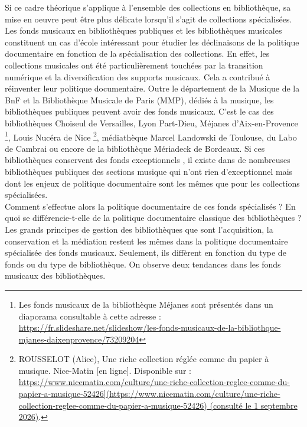 Si ce cadre théorique s'applique à l'ensemble des collections en bibliothèque, sa mise en oeuvre peut être plus délicate lorsqu'il s'agit de collections spécialisées.
Les fonds musicaux en bibliothèques publiques et les bibliothèques musicales constituent un cas d'école intéressant pour étudier les déclinaisons de la politique documentaire en fonction de la spécialisation des collections. 
En effet, les collections musicales ont été particulièrement touchées par la transition numérique et la diversification des supports musicaux. Cela a contribué à réinventer leur politique documentaire. 
Outre le département de la Musique de la BnF et la Bibliothèque Musicale de Paris (MMP), dédiés à la musique, les bibliothèques publiques peuvent avoir des fonds musicaux. C'est le cas des bibliothèques Choiseul de Versailles, Lyon Part-Dieu, Méjanes d'Aix-en-Provence \footnote{Les fonds musicaux de la bibliothèque Méjanes sont présentés dans un diaporama consultable à cette adresse : \url{https://fr.slideshare.net/slideshow/les-fonds-musicaux-de-la-bibliothque-mjanes-daixenprovence/73209204} }, Louis Nucéra de Nice \footnote{ROUSSELOT (Alice), Une riche collection réglée comme du papier à musique. Nice-Matin [en ligne]. Disponible sur : \url{https://www.nicematin.com/culture/une-riche-collection-reglee-comme-du-papier-a-musique-52426](https://www.nicematin.com/culture/une-riche-collection-reglee-comme-du-papier-a-musique-52426) (consulté le 1 septembre 2026)}.}, médiathèque Marcel Landowski de Toulouse, du Labo de Cambrai ou encore de la bibliothèque Mériadeck de Bordeaux. Si ces bibliothèques conservent des fonds exceptionnels , il existe dans de nombreuses bibliothèques publiques des sections musique qui n'ont rien d'exceptionnel mais dont les enjeux de politique documentaire sont les mêmes que pour les collections spécialisées. \\

Comment s'effectue alors la politique documentaire de ces fonds spécialisés ? En quoi se différencie-t-elle de la politique documentaire classique des bibliothèques ? \\

Les grands principes de gestion des bibliothèques que sont l'acquisition, la conservation et la médiation restent les mêmes dans la politique documentaire spécialisée des fonds musicaux. Seulement, ils diffèrent en fonction du type de fonds ou du type de bibliothèque. 
On observe deux tendances dans les fonds musicaux des bibliothèques.\\
 
